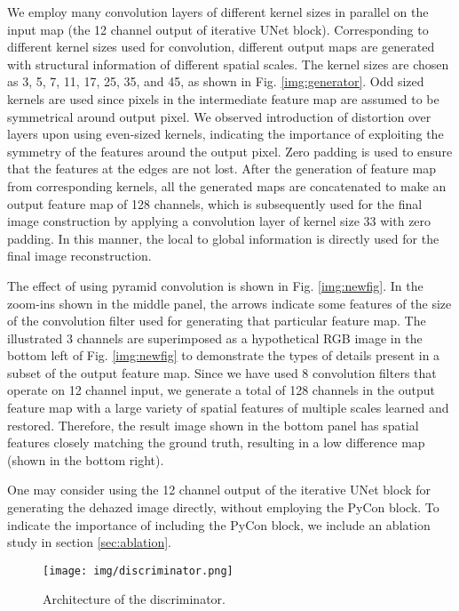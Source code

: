 \documentclass[runningheads]{llncs}
\begin{document}
We employ many convolution layers of different kernel sizes in parallel on the input map (the 12 channel output of iterative UNet block). Corresponding to different kernel sizes used for convolution, different output maps are generated with structural information of different spatial scales. The kernel sizes are chosen as 3, 5, 7, 11, 17, 25, 35, and 45, as shown in Fig. \ref{img:generator}. Odd sized kernels are used since pixels in the intermediate feature map are assumed to be symmetrical around output pixel. We observed introduction of distortion over layers upon using even-sized kernels, indicating the importance of exploiting the symmetry of the features around the output pixel. Zero padding is used to ensure that the features at the edges are not lost. After the generation of feature map from corresponding kernels, all the generated maps are concatenated to make an output feature map of 128 channels, which is subsequently used for the final image construction by applying a convolution layer of kernel size 33 with zero padding.  In this manner, the local to global information is directly used for the final image reconstruction.

The effect of using pyramid convolution is shown in Fig. \ref{img:newfig}. In the zoom-ins shown in the middle panel, the arrows indicate some features of the size of the convolution filter used for generating that particular feature map. The illustrated 3 channels are superimposed as a hypothetical RGB image in the bottom left of Fig. \ref{img:newfig} to demonstrate the types of details present in a subset of the output feature map. Since we have used 8 convolution filters that operate on 12 channel input, we generate a total of 128 channels in the output feature map with a large variety of spatial features of multiple scales learned and restored. Therefore, the result image shown in the bottom panel has spatial features closely matching the ground truth, resulting in a low difference map (shown in the bottom right). 

One may consider using the 12 channel output of the iterative UNet block for generating the dehazed image directly, without employing the PyCon block. To indicate the importance of including the PyCon block, we include an ablation study in section \ref{sec:ablation}. 

\begin{figure}[t]
    \centering
    \texttt{[image: img/discriminator.png]}
    \caption{Architecture of the discriminator.}
    \label{fig:discriminator}
\end{figure}
\end{document}
